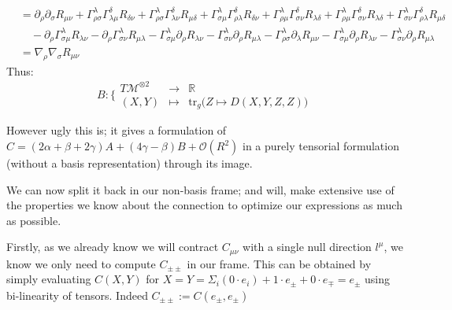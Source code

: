 \documentclass[a4paper,11pt]{article}
\numberwithin{equation}{section}
\theoremstyle{definition}
\begin{document}
\begin{align*}
    &= \partial_\rho\partial_\sigma R_{\mu\nu}
    + \Gamma_{\rho\sigma}^\lambda \Gamma_{\lambda\mu}^\delta R_{\delta\nu}
    + \Gamma_{\rho\sigma}^\lambda \Gamma_{\lambda\nu}^\delta R_{\mu\delta}
    + \Gamma_{\sigma\mu}^\lambda\Gamma_{\rho\lambda}^\delta R_{\delta\nu}
    + \Gamma_{\rho\mu}^\lambda\Gamma_{\sigma\nu}^\delta R_{\lambda\delta}
    + \Gamma_{\rho\mu}^\lambda\Gamma_{\sigma\nu}^\delta R_{\lambda\delta}
    + \Gamma_{\sigma\nu}^\lambda \Gamma_{\rho\lambda}^\delta R_{\mu\delta}\\
    &\quad - \partial_\rho \Gamma_{\sigma\mu}^\lambda R_{\lambda\nu}
    - \partial_\rho \Gamma_{\sigma\nu}^\lambda R_{\mu\lambda}
    - \Gamma_{\sigma\mu}^\lambda \partial_\rho R_{\lambda\nu}
    - \Gamma_{\sigma\nu}^\lambda \partial_\rho R_{\mu\lambda}
    - \Gamma_{\rho\sigma}^\lambda \partial_\lambda R_{\mu\nu}
    - \Gamma_{\sigma\mu}^\lambda \partial_\rho R_{\lambda\nu}
    - \Gamma_{\sigma\nu}^\lambda \partial_\rho R_{\mu\lambda}\\
    &= \nabla_\rho \nabla_\sigma R_{\mu\nu}
\end{align*}
Thus:
\begin{equation}
    B:\bigg\{ \begin{matrix}
        T\mathcal{M}^{\otimes 2} & \to & \mathbb{R}\\
        (X,Y) & \mapsto & \mathrm{tr}_g \big(Z \mapsto D(X,Y,Z,Z)\big)
    \end{matrix}
\end{equation}

However ugly this is; it gives a formulation of $C=(2\alpha + \beta + 2\gamma) A +(4\gamma- \beta) B + \mathcal{O}(R^2)$ in a purely tensorial formulation (without a basis representation) through its image.

We can now split it back in our non-basis frame; and will, make extensive use of the properties we know about the connection to optimize our expressions as much as possible.

Firstly, as we already know we will contract $C_{\mu\nu}$ with a single null direction $l^\mu$, we know we only need to compute $C_{\pm\pm}$ in our frame.
This can be obtained by simply evaluating $C(X,Y)$ for $X=Y=\Sigma_i(0\cdot e_i) + 1 \cdot e_\pm + 0 \cdot e_\mp = e_\pm$ using bi-linearity of tensors. Indeed $C_{\pm\pm}:=C(e_\pm,e_\pm)$
\end{document}
